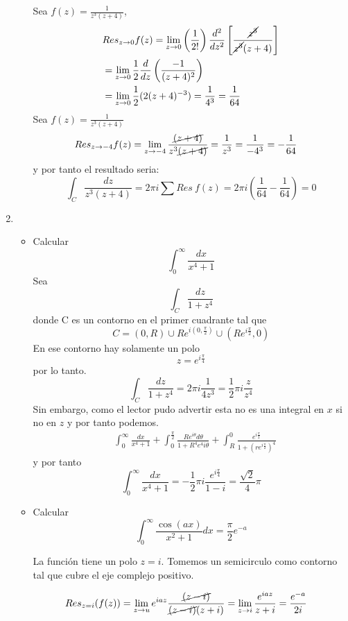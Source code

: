 \documentclass[12pt]{exam}
\begin{document}
\begin{enumerate}
\begin{itemize}
    Sea $f(z)=\frac{1}{z^3(z+4)}$,
    \begin{align*}
        &Res_{z\to0} f(z) = \lim_{z\to0}\left(\frac{1}{2!}\right)\frac{d^2}{dz^2}\left[\frac{\cancel{z^3}}{\cancel{z^3}(z+4)}\right]\\
        &=\lim_{z\to0}\frac{1}{2}\frac{d}{dz}\left(\frac{-1}{(z+4)^2}\right)\\
        &=\lim_{z\to0}\frac{1}{2}(2(z+4)^{-3})= \frac{1}{4^3}=\frac{1}{64}
    \end{align*}
    Sea $f(z)=\frac{1}{z^3(z+4)}$
    \begin{align*}
        &Res_{z\to-4}f(z)=\lim_{z\to-4}\frac{\cancel{(z+4)}}{z^3\cancel{(z+4)}}=\frac{1}{z^3}=\frac{1}{-4^3}=-\frac{1}{64}
    \end{align*}
    y por tanto el resultado seria:
    $$\int_C \frac{dz}{z^3(z+4)}=2\pi i \sum Res\ f(z) = 2 \pi i \left(\frac{1}{64} - \frac{1}{64}\right) = 0$$
\end{itemize}
\item \begin{itemize}
    \item Calcular $$\int_0^{\infty} \frac{dx}{x^4+1}$$
    Sea $$\int_C \frac{dz}{1+z^4}$$ donde C es un contorno en el primer cuadrante tal que $$C = (0,R)\cup Re^{i(0,\frac{\pi}{2})}\cup(Re^{i\frac{\pi}{2}},0)$$
    En ese contorno hay solamente un polo $$z=e^{i\frac{\pi}{4}}$$ por lo tanto. $$\int_C \frac{dz}{1+z^4}=2\pi i \frac{1}{4z^3} = \frac{1}{2}\pi i \frac{z}{z^4}$$
    Sin embargo, como el lector pudo advertir esta no es una integral en $x$ si no en $z$ y por tanto podemos. 
    \begin{align*}
        &\int_0^\infty \frac{dx}{x^4+1} + \int_0^\frac{\pi}{2} \frac{Re^{i\theta}d\theta}{1+R^4e^4i\theta} + \int_R^0 \frac{e^{i\frac{\pi}{2}}}{1+(re^{i\frac{\pi}{2}})^4}
    \end{align*}
    y por tanto $$\int_0^\infty \frac{dx}{x^4+1} = -\frac{1}{2}\pi i \frac{e^{i\frac{\pi}{4}}}{1-i}=\frac{\sqrt{2}}{4}\pi$$
    \item Calcular $$\int_0^{\infty} \frac{\cos(ax)}{x^2+1}dx=\frac{\pi}{2}e^{-a}$$
    
    La función tiene un polo $z = i$. Tomemos un semicirculo como contorno tal que cubre el eje complejo positivo.

    \begin{align*}
        &Res_{z=i}(f(z)) = \lim_{z\to u}e^{iaz}\frac{\cancel{(z-i)}}{\cancel{(z-i)}(z+i)}=\lim_{z\to i}\frac{e^{iaz}}{z+i}=\frac{e^{-a}}{2i}
    \end{align*}


\end{itemize}
\end{enumerate}
\end{document}
